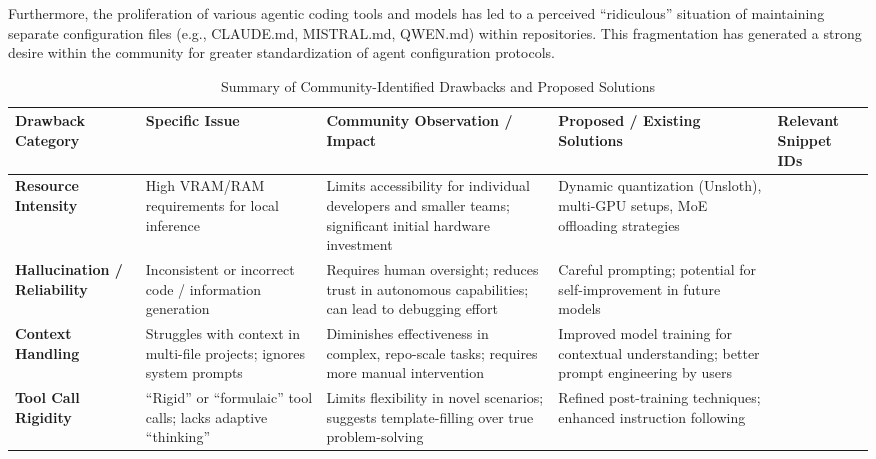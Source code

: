 Furthermore, the proliferation of various agentic coding tools and models has led to a perceived ``ridiculous'' situation of maintaining separate configuration files (e.g., CLAUDE.md, MISTRAL.md, QWEN.md) within repositories. This fragmentation has generated a strong desire within the community for greater standardization of agent configuration protocols.\cite{hackernews_qwen3coder_2025}

\begin{table}[htbp]
	\centering
	\caption{Summary of Community-Identified Drawbacks and Proposed Solutions}
	\footnotesize
	\raggedright
	\begin{tabu}{XXXXX}
		\toprule
		Drawback Category                    & Specific Issue                                                        & Community Observation / Impact                                                                            & Proposed / Existing Solutions                                                            & Relevant Snippet IDs                                                                                           \\
        \midrule
		\textbf{Resource Intensity}          & High VRAM/RAM requirements for local inference                        & Limits accessibility for individual developers and smaller teams; significant initial hardware investment & Dynamic quantization (Unsloth), multi-GPU setups, MoE offloading strategies              & \cite{hackernews_qwen3coder_2025, unsloth_qwen3coder_local_2025}                                               \\
		\textbf{Hallucination / Reliability} & Inconsistent or incorrect code / information generation               & Requires human oversight; reduces trust in autonomous capabilities; can lead to debugging effort          & Careful prompting; potential for self-improvement in future models                       & \cite{hackernews_qwen3coder_2025, reddit_localllama_qwen3coder_1_2025, reddit_localllama_kimi_qwen3coder_2025} \\
		\textbf{Context Handling}            & Struggles with context in multi-file projects; ignores system prompts & Diminishes effectiveness in complex, repo-scale tasks; requires more manual intervention                  & Improved model training for contextual understanding; better prompt engineering by users & \cite{reddit_localllama_kimi_qwen3coder_2025}                                                                  \\
		\textbf{Tool Call Rigidity}          & ``Rigid'' or ``formulaic'' tool calls; lacks adaptive ``thinking''    & Limits flexibility in novel scenarios; suggests template-filling over true problem-solving                & Refined post-training techniques; enhanced instruction following                         & \cite{reddit_localllama_kimi_qwen3coder_2025}                                                                  \\

\end{tabu}
\end{table}

